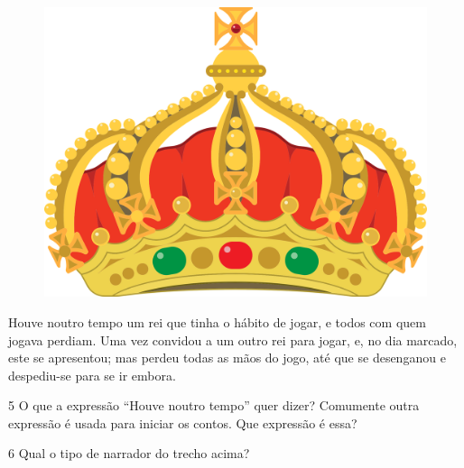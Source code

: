 \begin{myquote}

\begin{figure}[H]
\centering
\includegraphics[scale=0.25]{./imgSAEB_7_POR/media/image35.png}
\end{figure}

Houve noutro tempo um rei que tinha o hábito de jogar, e todos com
quem jogava perdiam. Uma vez convidou a um outro rei para jogar, e, no
dia marcado, este se apresentou; mas perdeu todas as mãos do jogo, até
que se desenganou e despediu-se para se ir embora.


\end{myquote}

\num{5} O que a expressão ``Houve noutro tempo'' quer dizer? Comumente outra
expressão é usada para iniciar os contos. Que expressão é essa?


\num{6} Qual o tipo de narrador do trecho acima?


\pagebreak


